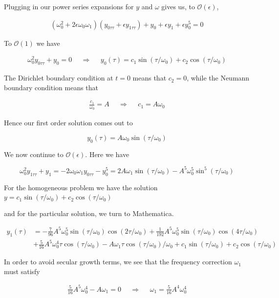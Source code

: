 \documentclass[12pt, a4paper]{article}
\begin{document}
\begin{enumerate}
\begin{enumerate}
    Plugging in our power series expansions for $y$ and $\omega$ gives us, to $\mathcal{O}(\epsilon)$, 

    \begin{align*}
        (\omega_0^2 + 2 \epsilon \omega_0 \omega_1)(y_{0\tau\tau} + \epsilon y_{1\tau\tau}) + y_0 + \epsilon y_1 + \epsilon y_0^5 = 0
    \end{align*}

    To $\mathcal{O}(1)$ we have

    \begin{align*}
        \omega_0^2 y_{0\tau\tau} + y_0 = 0 && \Rightarrow && y_0(\tau) = c_1 \sin(\tau/\omega_0) + c_2 \cos(\tau/\omega_0)
    \end{align*}

    The Dirichlet boundary condition at $t=0$ means that $c_2=0$, while the Neumann boundary condition means that

    \begin{align*}
        \frac{c_1}{\omega_0} = A && \Rightarrow && c_1 = A \omega_0
    \end{align*}

    Hence our first order solution comes out to

    $$y_0(\tau) = A\omega_0 \sin(\tau/\omega_0)$$

    We now continue to $\mathcal{O}(\epsilon)$. Here we have

    $$\omega_0^2 y_{1\tau\tau} + y_1 = -2\omega_0\omega_1 y_{0\tau\tau} - y_0^5 = 2A\omega_1\sin(\tau/\omega_0) - A^5 \omega_0^5 \sin^5(\tau/\omega_0)$$

    For the homogeneous problem we have the solution $y = c_1 \sin(\tau/\omega_0) + c_2 \cos(\tau/\omega_0)$

    and for the particular solution, we turn to Mathematica.

    \begin{align*}
        y_1(\tau) &= -\frac{7}{96}A^5\omega_0^5\sin(\tau/\omega_0)\cos(2\tau/\omega_0) + \frac{1}{192}A^5\omega_0^5\sin(\tau/\omega_0)\cos(4\tau/\omega_0) \\&+ \frac{5}{16}A^5\omega_0^4\tau\cos(\tau/\omega_0) - A\omega_1\tau\cos(\tau/\omega_0)/\omega_0 + c_1\sin(\tau/\omega_0) + c_2\cos(\tau/\omega_0)
    \end{align*}

    In order to avoid secular growth terms, we see that the frequency correction $\omega_1$ must satisfy

    \begin{align*}
        \frac{5}{16} A^5 \omega_0^4 - A\omega_1 = 0 && \Rightarrow && \omega_1 = \frac{5}{16} A^4 \omega_0^4
    \end{align*}


\end{enumerate}
\end{enumerate}
\end{document}
